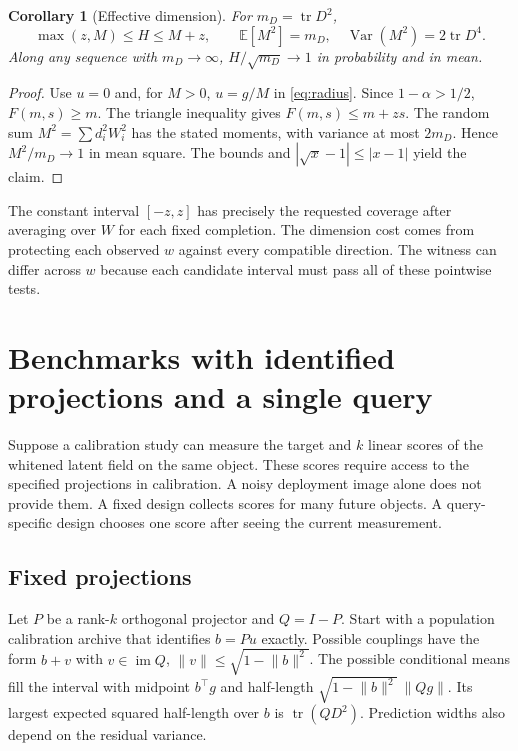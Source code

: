 \documentclass[11pt]{article}
\newtheorem{corollary}[theorem]{Corollary}
\newcommand{\E}{\mathbb E}
\newcommand{\norm}[1]{\lVert #1\rVert}
\newcommand{\tr}{\operatorname{tr}}
\newcommand{\Var}{\operatorname{Var}}
\begin{document}
\begin{corollary}[Effective dimension]\label{cor:dimension}
For $m_D=\tr D^2$,
\[
 \max(z,M)\le H\le M+z,\qquad
 \E[M^2]=m_D,\quad \Var(M^2)=2\tr D^4.
\]
Along any sequence with $m_D\to\infty$, $H/\sqrt{m_D}\to1$ in probability and in mean.
\end{corollary}
\begin{proof}
Use $u=0$ and, for $M>0$, $u=g/M$ in \eqref{eq:radius}. Since $1-\alpha>1/2$, $F(m,s)\ge m$. The triangle inequality gives $F(m,s)\le m+zs$. The random sum $M^2=\sum d_i^2W_i^2$ has the stated moments, with variance at most $2m_D$. Hence $M^2/m_D\to1$ in mean square. The bounds and $|\sqrt{x}-1|\le|x-1|$ yield the claim.
\end{proof}
The constant interval $[-z,z]$ has precisely the requested coverage after averaging over $W$ for each fixed completion. The dimension cost comes from protecting each observed $w$ against every compatible direction. The witness can differ across $w$ because each candidate interval must pass all of these pointwise tests.

\section{Benchmarks with identified projections and a single query}
Suppose a calibration study can measure the target and $k$ linear scores of the whitened latent field on the same object. These scores require access to the specified projections in calibration. A noisy deployment image alone does not provide them. A fixed design collects scores for many future objects. A query-specific design chooses one score after seeing the current measurement.

\subsection{Fixed projections}
Let $P$ be a rank-$k$ orthogonal projector and $Q=I-P$. Start with a population calibration archive that identifies $b=Pu$ exactly. Possible couplings have the form $b+v$ with $v\in\operatorname{im}Q$, $\norm v\le\sqrt{1-\norm b^2}$. The possible conditional means fill the interval with midpoint $b^\top g$ and half-length $\sqrt{1-\norm b^2}\,\norm{Qg}$. Its largest expected squared half-length over $b$ is $\tr(QD^2)$. Prediction widths also depend on the residual variance.
\end{document}
